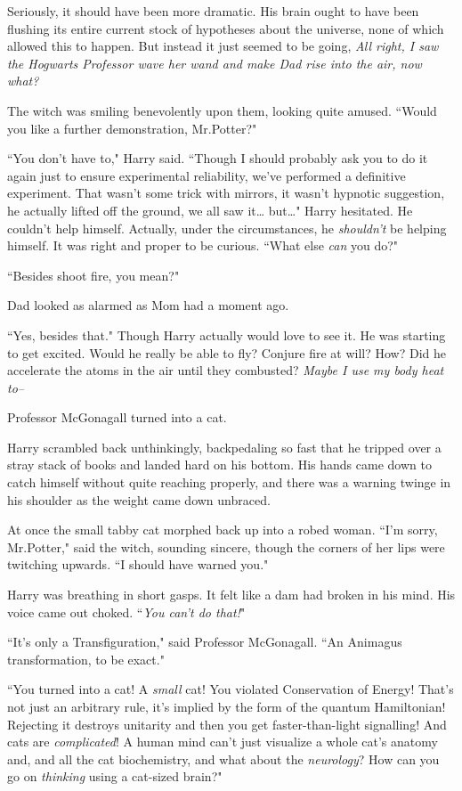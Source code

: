 Seriously, it should have been more dramatic. His brain ought to have been flushing its entire current stock of hypotheses about the universe, none of which allowed this to happen. But instead it just seemed to be going, \emph{All right, I saw the Hogwarts Professor wave her wand and make Dad rise into the air, now what?}

The witch was smiling benevolently upon them, looking quite amused. ``Would you like a further demonstration, Mr.\?Potter?"

``You don't have to," Harry said. ``Though I should probably ask you to do it again just to ensure experimental reliability, we've performed a definitive experiment. That wasn't some trick with mirrors, it wasn't hypnotic suggestion, he actually lifted off the ground, we all saw it{\ldots} but{\ldots}" Harry hesitated. He couldn't help himself. Actually, under the circumstances, he \emph{shouldn't} be helping himself. It was right and proper to be curious. ``What else \emph{can} you do?"

``Besides shoot fire, you mean?"

Dad looked as alarmed as Mom had a moment ago.

``Yes, besides that." Though Harry actually would love to see it. He was starting to get excited. Would he really be able to fly? Conjure fire at will? How? Did he accelerate the atoms in the air until they combusted? \emph{Maybe I use my body heat to\---}

Professor McGonagall turned into a cat.

Harry scrambled back unthinkingly, backpedaling so fast that he tripped over a stray stack of books and landed hard on his bottom. His hands came down to catch himself without quite reaching properly, and there was a warning twinge in his shoulder as the weight came down unbraced.

At once the small tabby cat morphed back up into a robed woman. ``I'm sorry, Mr.\?Potter," said the witch, sounding sincere, though the corners of her lips were twitching upwards. ``I should have warned you."

Harry was breathing in short gasps. It felt like a dam had broken in his mind. His voice came out choked. ``\emph{You can't \emph{do} that!}"

``It's only a Transfiguration," said Professor McGonagall. ``An Animagus transformation, to be exact."

``You turned into a cat! A \emph{small} cat! You violated Conservation of Energy! That's not just an arbitrary rule, it's implied by the form of the quantum Hamiltonian! Rejecting it destroys unitarity and then you get faster-than-light signalling! And cats are \emph{complicated}! A human mind can't just visualize a whole cat's anatomy and, and all the cat biochemistry, and what about the \emph{neurology}? How can you go on \emph{thinking} using a cat-sized brain?"

